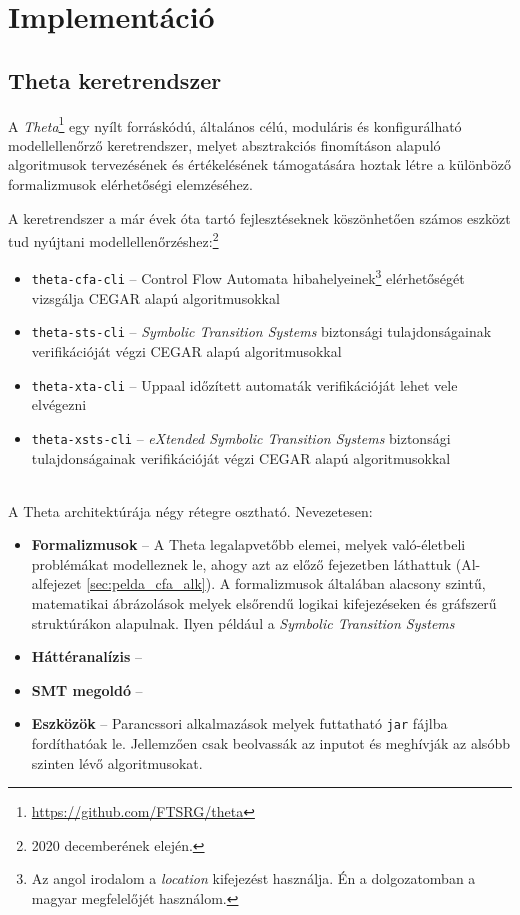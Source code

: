 \chapter{Implementáció}

\section{Theta keretrendszer}
\label{sec:theta_keretrendszer}

A \emph{Theta}\footnote{\url{https://github.com/FTSRG/theta}} egy nyílt forráskódú, általános célú, moduláris és konfigurálható modellellenőrző keretrendszer, melyet absztrakciós finomításon alapuló algoritmusok tervezésének és értékelésének támogatására hoztak létre a különböző formalizmusok elérhetőségi elemzéséhez.

A keretrendszer a már évek óta tartó fejlesztéseknek köszönhetően számos eszközt tud nyújtani modellellenőrzéshez:\footnote{2020 decemberének elején.}

\begin{itemize}
	\item \verb+theta-cfa-cli+ -- Control Flow Automata hibahelyeinek\footnote{Az angol irodalom a \emph{location} kifejezést használja. Én a dolgozatomban a magyar megfelelőjét használom.} elérhetőségét vizsgálja CEGAR alapú algoritmusokkal
	
	\item \verb+theta-sts-cli+ -- \emph{Symbolic Transition Systems} biztonsági tulajdonságainak verifikációját végzi CEGAR alapú algoritmusokkal
	
	\item \verb+theta-xta-cli+ -- Uppaal időzített automaták verifikációját lehet vele elvégezni
	
	\item \verb+theta-xsts-cli+ -- \emph{eXtended Symbolic Transition Systems} biztonsági tulajdonságainak verifikációját végzi CEGAR alapú algoritmusokkal
\end{itemize}
\ \\
A Theta architektúrája négy rétegre osztható. Nevezetesen:

\begin{itemize}
	\item \textbf{Formalizmusok} -- A Theta legalapvetőbb elemei, melyek való-életbeli problémákat modelleznek le, ahogy azt az előző fejezetben láthattuk (Al-alfejezet \ref{sec:pelda_cfa_alk}). A formalizmusok általában alacsony szintű, matematikai ábrázolások melyek elsőrendű logikai kifejezéseken és gráfszerű struktúrákon alapulnak. Ilyen például a \emph{Symbolic Transition Systems} 
	
	\item \textbf{Háttéranalízis} -- 
	
	\item \textbf{SMT megoldó} -- 
	
	\item \textbf{Eszközök} -- Parancssori alkalmazások melyek futtatható \verb+jar+ fájlba fordíthatóak le. Jellemzően csak beolvassák az inputot és meghívják az alsóbb szinten lévő algoritmusokat. 
	
\end{itemize}

